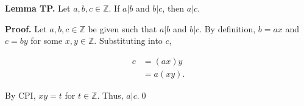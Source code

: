 \documentclass[12pt]{article}
\begin{document}
\noindent\textbf{Lemma TP.} Let $a,b,c\in\mathbb{Z}$. If $a|b$ and $b|c$, then $a|c$.

\bigskip

\noindent\textbf{Proof.} Let $a,b,c\in\mathbb{Z}$ be given such that $a|b$ and $b|c$. By definition, $b=ax$ and $c=by$ for some $x,y\in\mathbb{Z}$. Substituting into $c$,

\begin{align*}
c &= (ax)y \\
&= a(xy).
\end{align*}

\noindent By CPI, $xy=t$ for $t\in\mathbb{Z}$. Thus, $a|c$.\qed
\end{document}
